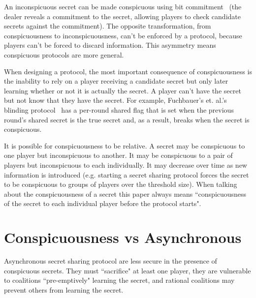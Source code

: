 \documentclass[12pt]{article}
\begin{document}
An inconspicuous secret can be made conspicuous using bit commitment~\cite{Damg02, naor91} (the dealer reveals a commitment to the secret, allowing players to check candidate secrets against the commitment). The opposite transformation, from conspicuousness to inconspicuousness, can't be enforced by a protocol, because players can't be forced to discard information. This asymmetry means conspicuous protocols are more general.

When designing a protocol, the most important consequence of conspicuousness is the inability to rely on a player receiving a candidate secret but only later learning whether or not it is actually the secret. A player can't have the secret but not know that they have the secret. For example, Fuchbauer's et. al.'s blinding protocol~\cite{fuch10} has a per-round shared flag that is set when the previous round's shared secret is the true secret and, as a result, breaks when the secret is conspicuous.

It is possible for conspicuousness to be relative. A secret may be conspicuous to one player but inconspicuous to another. It may be conspicuous to a pair of players but inconspicuous to each individually. It may decrease over time as new information is introduced (e.g. starting a secret sharing protocol forces the secret to be conspicuous to groups of players over the threshold size). When talking about the conspicuousness of a secret this paper always means ``conspicuousness of the secret to each individual player before the protocol starts".

\section{Conspicuousness vs Asynchronous}
\label{Sec:AsympWeak}

Asynchronous secret sharing protocol are less secure in the presence of conspicuous secrets. They must ``sacrifice" at least one player, they are vulnerable to coalitions ``pre-emptively" learning the secret, and rational coalitions may prevent others from learning the secret.
\end{document}
